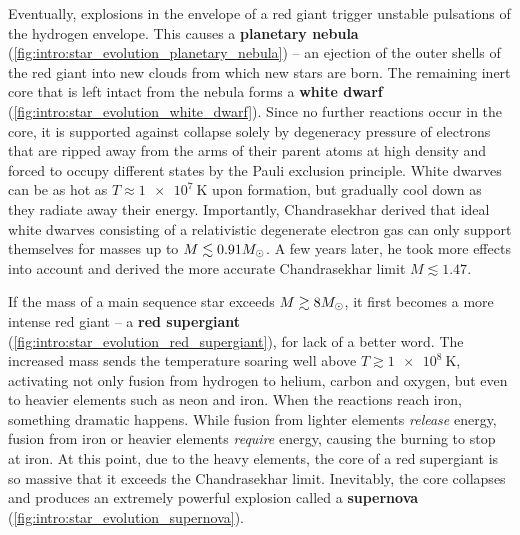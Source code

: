 Eventually, explosions in the envelope of a red giant trigger unstable pulsations of the hydrogen envelope.
This causes a \textbf{planetary nebula} (\cref{fig:intro:star_evolution_planetary_nebula}) -- an ejection of the outer shells of the red giant into new clouds from which new stars are born.
The remaining inert core that is left intact from the nebula forms a \textbf{white dwarf} (\cref{fig:intro:star_evolution_white_dwarf}).
Since no further reactions occur in the core, it is supported against collapse solely by degeneracy pressure of electrons that are ripped away from the arms of their parent atoms at high density and forced to occupy different states by the Pauli exclusion principle.
White dwarves can be as hot as $T \approx \SI{1e7}{\kelvin}$ upon formation, but gradually cool down as they radiate away their energy.
Importantly, Chandrasekhar derived that ideal white dwarves consisting of a relativistic degenerate electron gas can only support themselves for masses up to $M \lesssim 0.91M_\odot$. \cite{ref:chandrasekhar_limit_ideal}
A few years later, he took more effects into account and derived the more accurate Chandrasekhar limit $M \lesssim 1.47$. \cite{ref:chandrasekhar_limit_nonideal}

If the mass of a main sequence star exceeds $M \gtrsim 8 M_\odot$, it first becomes a more intense red giant -- a \textbf{red supergiant} (\cref{fig:intro:star_evolution_red_supergiant}), for lack of a better word.
The increased mass sends the temperature soaring well above $T \gtrsim \SI{1e8}{\kelvin}$, activating not only fusion from hydrogen to helium, carbon and oxygen, but even to heavier elements such as neon and iron.
When the reactions reach iron, something dramatic happens.
While fusion from lighter elements \emph{release} energy, fusion from iron or heavier elements \emph{require} energy, causing the burning to stop at iron.
At this point, due to the heavy elements, the core of a red supergiant is so massive that it exceeds the Chandrasekhar limit.
Inevitably, the core collapses and produces an extremely powerful explosion called a \textbf{supernova} (\cref{fig:intro:star_evolution_supernova}).


